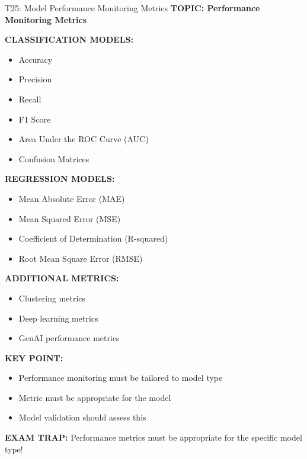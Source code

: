 \documentclass[8pt]{beamer}
\begin{document}
	\begin{frame}{T25: Model Performance Monitoring Metrics}
		\fontsize{6.5}{7.5}\selectfont
		\textbf{TOPIC: Performance Monitoring Metrics}
		
		\vspace{0.1cm}
		\textbf{CLASSIFICATION MODELS:}
		\begin{itemize}
			\item Accuracy
			\item Precision
			\item Recall
			\item F1 Score
			\item Area Under the ROC Curve (AUC)
			\item Confusion Matrices
		\end{itemize}
		
		\vspace{0.1cm}
		\textbf{REGRESSION MODELS:}
		\begin{itemize}
			\item Mean Absolute Error (MAE)
			\item Mean Squared Error (MSE)
			\item Coefficient of Determination (R-squared)
			\item Root Mean Square Error (RMSE)
		\end{itemize}
		
		\vspace{0.1cm}
		\textbf{ADDITIONAL METRICS:}
		\begin{itemize}
			\item Clustering metrics
			\item Deep learning metrics
			\item GenAI performance metrics
		\end{itemize}
		
		\vspace{0.1cm}
		\textbf{KEY POINT:}
		\begin{itemize}
			\item Performance monitoring must be tailored to model type
			\item Metric must be appropriate for the model
			\item Model validation should assess this
		\end{itemize}
		
		\textcolor{myred}{\textbf{EXAM TRAP:}} Performance metrics must be \textcolor{myblue}{appropriate for the specific model type}!
	\end{frame}
	
\end{document}

